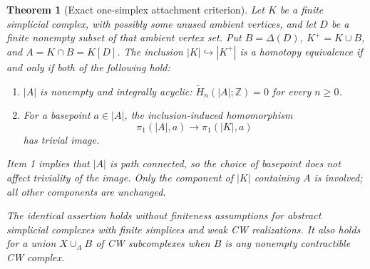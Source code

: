 \documentclass[11pt]{article}
\newtheorem{theorem}{Theorem}[section]
\theoremstyle{definition}
\begin{document}
\begin{theorem}[Exact one-simplex attachment criterion]
\label{gt:one-test}
Let $K$ be a finite simplicial complex, with possibly some unused ambient
vertices, and let $D$ be a finite nonempty subset of that ambient vertex
set. Put $B=\Delta(D)$, $K^+=K\cup B$, and $A=K\cap B=K[D]$.
The inclusion $|K|\hookrightarrow|K^+|$ is a homotopy equivalence if and
only if both of the following hold:
\begin{enumerate}
\item $|A|$ is nonempty and integrally acyclic:
$\widetilde H_n(|A|;\mathbb Z)=0$ for every $n\geq0$.
\item For a basepoint $a\in|A|$, the inclusion-induced homomorphism
\[
 \pi_1(|A|,a)\longrightarrow\pi_1(|K|,a)
\]
has trivial image.
\end{enumerate}
Item 1 implies that $|A|$ is path connected, so the choice of basepoint
does not affect triviality of the image. Only the component of $|K|$
containing $A$ is involved; all other components are unchanged.

The identical assertion holds without finiteness assumptions for
abstract simplicial complexes with finite simplices and weak CW
realizations. It also holds for a union $X\cup_A B$ of CW subcomplexes
when $B$ is any nonempty contractible CW complex.
\end{theorem}
\end{document}
